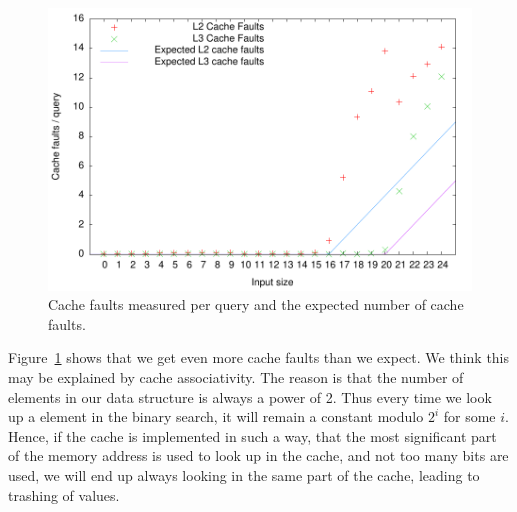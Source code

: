 \begin{figure}[h!]
  \centering
  \includegraphics[width=\textwidth]{../week1/plots/outputs/bs_cachefaults}
  \caption{Cache faults measured per query and the expected number of cache faults.}
  \label{fig:bs_cachefaults}
\end{figure}

Figure~\ref{fig:bs_cachefaults} shows that we get even more cache
faults than we expect. We think this may be explained by cache
associativity. The reason is that the number of elements in our data structure is
always a power of 2. Thus every time we look up a element in the
binary search, it will remain a constant modulo $2^i$ for some $i$.
Hence, if the cache is implemented in such a way, that the most
significant part of the memory address is used to look up in the
cache, and not too many bits are used, we will end up always looking
in the same part of the cache, leading to trashing of values.

